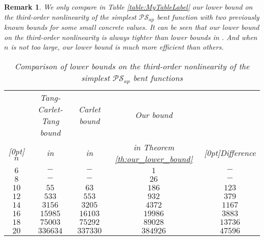 \documentclass{article}
\newcommand{\0}{\textbf{0}}
\newcommand{\1}{\textbf{1}}
\theoremstyle{plain}
\newtheorem{remark}{Remark}
\begin{document}
    \begin{remark}
        \newcommand{\rb}[1]{\raisebox{1.5ex}[0pt]{#1}}
        We only compare in Table \ref{table:MyTableLabel} our lower bound on the third-order nonlinearity of the simplest $\mathcal{PS}_{ap}$ bent function with two previously known bounds for some small concrete values.
        It can be seen that our lower bound on the third-order nonlinearity is always tighter than lower bounds in \cite{TangCT2013NL_2bent,Carlet2011NL_Profile_Dillon}.
        And when $n$ is not too large, our lower bound is much more efficient than others.
        \begin{table}
            \centering
            \caption{Comparison of lower bounds on the third-order nonlinearity of the simplest $\mathcal{PS}_{ap}$ bent functions}
            \begin{threeparttable}
                \begin{tabular}{|c|c|c|c|c|}
                    \hline
                            & Tang-Carlet-Tang bound      & Carlet bound                            & Our bound& \\
                    \rb{$n$}& in \cite{TangCT2013NL_2bent}& in \cite{Carlet2011NL_Profile_Dillon} & in Theorem \ref{th:our_lower_bound}     &\rb{Difference\tnote{1}}   \\
                    \hline
                    $6  $ &  $ -           $       & $ -        $     & $ 1        $     & $  -       $ \\  \hline
                    $8  $ &  $ -           $       & $ -        $     & $ 26       $     & $  -       $ \\  \hline
                    $10 $ &  $ 55          $       & $ 63       $     & $ 186      $     & $  123     $ \\  \hline
                    $12 $ &  $ 533         $       & $ 553      $     & $ 932      $     & $  379     $ \\  \hline
                    $14 $ &  $ 3156        $       & $ 3205     $     & $ 4372     $     & $  1167    $ \\  \hline
                    $16 $ &  $ 15985       $       & $ 16103    $     & $ 19986    $     & $  3883    $ \\  \hline
                    $18 $ &  $ 75003       $       & $ 75292    $     & $ 89028    $     & $  13736   $ \\  \hline
                    $20 $ &  $ 336634      $       & $ 337330   $     & $ 384926   $     & $  47596   $ \\  \hline

\end{tabular}
\end{threeparttable}
\end{table}
\end{remark}
\end{document}
